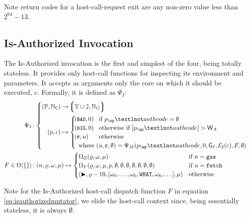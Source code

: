 Note return codes for a host-call-request exit are any non-zero value less than $2^{64} - 13$.

\subsection{Is-Authorized Invocation}\label{sec:isauthorizedinvocation}

\newcommand*{\wpX}{p}

The Is-Authorized invocation is the first and simplest of the four, being totally stateless. It provides only host-call functions for inspecting its environment and parameters. It accepts as arguments only the core on which it should be executed, $c$. Formally, it is defined as $\Psi_I$:
\begin{align}
  \Psi_I &\colon \abracegroup{
    (\workpackage, \coreindex) &\to \tuple{\blob \cup \workerror, \gas} \\
    (\wpX, c) &\mapsto \begin{cases}
      \tup{\token{BAD}, 0} &\when \wpX_\wp¬authcode = \none \\
      \tup{\token{BIG}, 0} &\otherwhen \len{\wpX_\wp¬authcode} > \mathsf{W}_A \\
      \tup{\mathbf{r}, u} &\otherwise \\
      \multicolumn{2}{l}{\where (u, \mathbf{r}, \none) = \Psi_M(\wpX_\wp¬authcode, 0, \mathsf{G}_I, \se_2(c), F, \none)}\\
    \end{cases}\\
  } \\
  \label{eq:isauthorizedmutator}F \in \Omega\ang{\emset} &\colon
    (n, \gascounter, \registers, \memory) \mapsto \begin{cases}
      \Omega_G(\gascounter, \registers, \memory) &\when n = \mathtt{gas} \\
      \Omega_Y(\gascounter, \registers, \memory, \wpX, \none, \none, \none, \none, \none, \none, \none) &\when n = \mathtt{fetch} \\
      (\continue, \gascounter - 10, [\registers_0, \dots, \registers_6, \mathtt{WHAT}, \registers_8, \dots], \memory) &\otherwise
    \end{cases}
\end{align}

Note for the Is-Authorized host-call dispatch function $F$ in equation \ref{eq:isauthorizedmutator}, we elide the host-call context since, being essentially stateless, it is always $\emptyset$.

